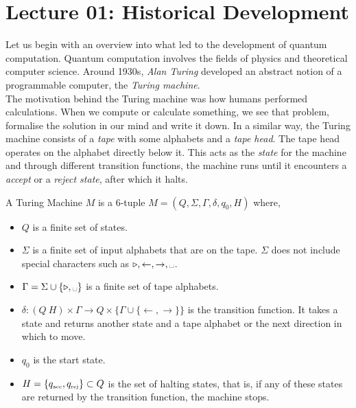 \section*{Lecture 01: Historical Development}
Let us begin with an overview into what led to the development of quantum computation. Quantum computation involves the fields of physics and theoretical computer science. Around 1930s, \textit{Alan Turing} developed an abstract notion of a programmable computer, the \textit{Turing machine}.\\[0.2cm]
The motivation behind the Turing machine was how humans performed calculations. When we compute or calculate something, we see that problem, formalise the solution in our mind and write it down. In a similar way, the Turing machine consists of a \textit{tape} with some alphabets and a \textit{tape head}. The tape head operates on the alphabet directly below it. This acts as the \textit{state} for the machine and through different transition functions, the machine runs until it encounters a \textit{accept} or a \textit{reject state}, after which it halts. 
\begin{definition}
    A Turing Machine $M$ is a 6-tuple $M=(Q,\Sigma, \Gamma, \delta, q_0, H)$ where,
    \begin{itemize}
        \item $Q$ is a finite set of states.
        \item $\Sigma$ is a finite set of input alphabets that are on the tape. $\Sigma$ does not include special characters such as $\triangleright, \leftarrow, \rightarrow, \text{\textvisiblespace}$.
        \item $\Gamma = \Sigma \cup \{\triangleright,  \text{\textvisiblespace}\}$ is a finite set of tape alphabets. 
        \item $\delta: (Q\ H)\times \Gamma \to Q\times\{\Gamma \cup \{\leftarrow, \rightarrow\}\}$ is the transition function. It takes a state and returns another state and a tape alphabet or the next direction in which to move. 
        \item $q_0$ is the start state.
        \item $H=\{q_{\text{\tiny acc}}, q_{\text{\tiny rej}}\}\subset Q$ is the set of halting states, that is, if any of these states are returned by the transition function, the machine stops. 
    \end{itemize}
\end{definition}
